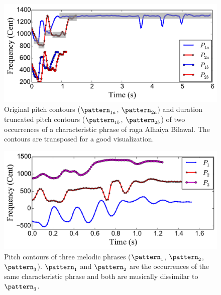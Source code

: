 \begin{figure}
	\begin{center}
		\includegraphics[width=\figSizeEightyFive]{ch06_patterns/figures/ImprovingSimilarity/Hindusani_flat_note_compression_example_reversed.pdf}
	\end{center}
	\caption{Original pitch contours ($\pattern_{1a}$, $\pattern_{2a}$) and duration truncated pitch contours ($\pattern_{1b}$, $\pattern_{2b}$) of two occurrences of a characteristic phrase of \gls{raga} Alhaiya Bilawal. The contours are transposed for a good visualization.}
	\label{fig:flatCompressionExample}
\end{figure}

\begin{figure}
	\begin{center}
		\includegraphics[width=\figSizeEightyFive]{ch06_patterns/figures/ImprovingSimilarity/CarnaticComplexityExample.pdf}
	\end{center}
	\caption{Pitch contours of three melodic phrases ($\pattern_1$, $\pattern_2$, $\pattern_3$). $\pattern_1$ and $\pattern_2$ are the occurrences of the same characteristic phrase and both are musically dissimilar to $\pattern_3$.} 
	\label{fig:carnaticComplexityExample}
\end{figure}

